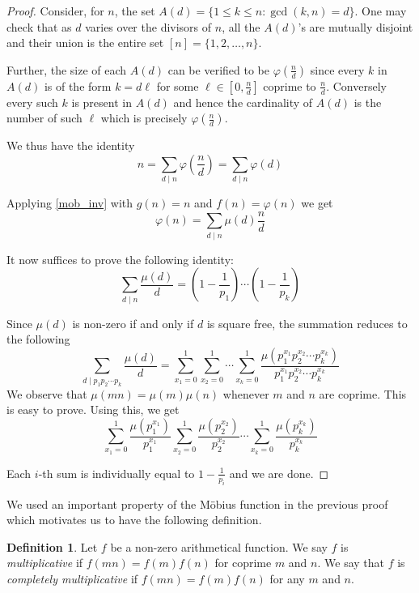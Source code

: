 \documentclass[10pt,openany]{book}
\theoremstyle{italicnonumber}
\theoremstyle{definition}
\newtheorem{definition}[theorem]{Definition}
\begin{document}
\begin{proof}
  Consider, for $n$, the set $A(d) = \{1 \leq k \leq n : \gcd(k,n) = d\}$. One may check that as $d$ varies over the divisors of $n$, all the $A(d)$'s are mutually disjoint and their union is the entire set $[n]=\{ 1,2,\dots,n \}$.

  Further, the size of each $A(d)$ can be verified to be $\varphi\left(\frac{n}{d}\right)$ since every $k$ in $A(d)$ is of the form $k=d \ell$ for some $\ell \in [0, \frac{n}{d}]$ coprime to $\frac{n}{d}$. Conversely every such $k$ is present in $A(d)$ and hence the cardinality of $A(d)$ is the number of such $\ell$ which is precisely $\varphi\left(\frac{n}{d}\right)$.

  We thus have the identity
  \[
  n = \sum_{d \mid n} \varphi\left(\frac{n}{d}\right) = \sum_{d \mid n} \varphi(d)
  \]

  Applying \cref{mob_inv} with $g(n) = n$ and $f(n)=\varphi(n)$ we get
  \[
  \varphi(n) = \sum_{d \mid n} \mu(d) \frac{n}{d}
  \]

  It now suffices to prove the following identity:
  \[
  \sum_{d \mid n} \frac{\mu(d)}{d} = \left(1-\frac{1}{p_1}\right) \cdots \left(1-\frac{1}{p_k}\right)
  \]

  Since $\mu(d)$ is non-zero if and only if $d$ is square free, the summation reduces to the following
  \[
  \sum_{d \mid p_1p_2\cdots p_k} \frac{\mu(d)}{d} = \sum_{x_1=0}^1 \sum_{x_2=0}^1 \cdots \sum_{x_k=0}^1 \frac{\mu\left( p_1^{x_1} p_2^{x_2} \cdots p_k^{x_k} \right)}{p_1^{x_1} p_2^{x_2} \cdots p_k^{x_k}}
  \]
  We observe that $\mu(mn)= \mu(m)\mu(n)$ whenever $m$ and $n$ are coprime. This is easy to prove. Using this, we get
  \[
  \sum_{x_1=0}^1 \frac{\mu\left( p_1^{x_1} \right)}{p_1^{x_1}}\sum_{x_2=0}^1 \frac{\mu\left( p_2^{x_2} \right)}{p_2^{x_2}} \cdots \sum_{x_k=0}^1 \frac{\mu\left( p_k^{x_k} \right)}{p_k^{x_k}}
  \]

  Each $i$-th sum is individually equal to $ \displaystyle 1 - \frac{1}{p_i} $ and we are done.
\end{proof}

We used an important property of the Möbius function in the previous proof which motivates us to have the following definition.

\begin{definition}
  Let $f$ be a non-zero arithmetical function. We say $f$ is \textit{multiplicative} if $f(mn)=f(m)f(n)$ for coprime $m$ and $n$. We say that $f$ is \textit{completely multiplicative} if $f(mn)=f(m)f(n)$ for any $m$ and $n$.
\end{definition}
\end{document}
